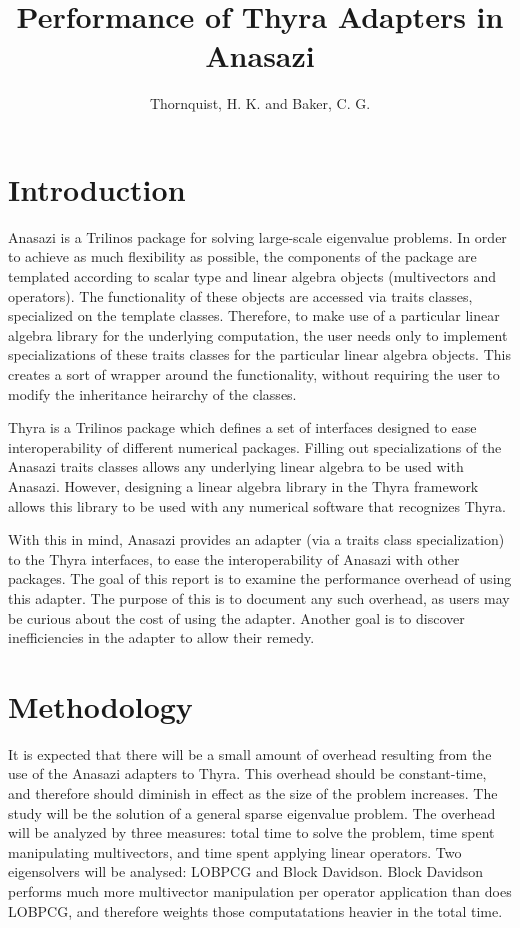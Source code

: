 \documentclass[10pt]{article}
\title{Performance of Thyra Adapters in Anasazi}
\author{Thornquist, H. K. and Baker, C. G.}
\begin{document}
\maketitle

\section{Introduction}

Anasazi is a Trilinos package for solving large-scale eigenvalue problems. In order to
achieve as much flexibility as possible, the components of the package are templated
according to scalar type and linear algebra objects (multivectors and operators). The
functionality of these objects are accessed via traits classes, specialized on the
template classes. Therefore, to make use of a particular linear algebra library for the
underlying computation, the user needs only to implement specializations of these traits
classes for the particular linear algebra objects. This creates a sort of wrapper around
the functionality, without requiring the user to modify the inheritance heirarchy of the
classes.

Thyra is a Trilinos package which defines a set of interfaces designed to ease
interoperability of different numerical packages. Filling out specializations of the
Anasazi traits classes allows any underlying linear algebra to be used with Anasazi.
However, designing a linear algebra library in the Thyra framework allows this library to
be used with any numerical software that recognizes Thyra. 

With this in mind, Anasazi provides an adapter (via a traits class specialization) to the
Thyra interfaces, to ease the interoperability of Anasazi with other packages. The goal of
this report is to examine the performance overhead of using this adapter. The purpose of
this is to document any such overhead, as users may be curious about the cost of using
the adapter. Another goal is to discover inefficiencies in the adapter to allow their
remedy.

\section{Methodology}

It is expected that there will be a small amount of overhead resulting from the use of the
Anasazi adapters to Thyra. This overhead should be constant-time, and therefore should
diminish in effect as the size of the problem increases. The study will be the solution of
a general sparse eigenvalue problem.  The overhead will be analyzed by three measures:
total time to solve the problem, time spent manipulating multivectors, and time spent
applying linear operators. Two eigensolvers will be analysed: LOBPCG and Block Davidson.
Block Davidson performs much more multivector manipulation per operator application than
does LOBPCG, and therefore weights those computatations heavier in the total time.
\end{document}

